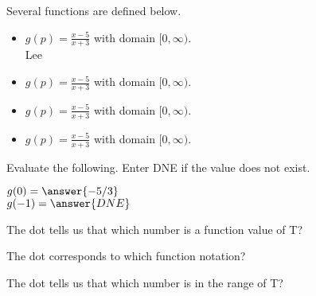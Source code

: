 \documentclass{ximera}
\begin{document}
\begin{definition}
Several functions are defined below.
\begin{itemize}
\item $g(p) = \frac{x-5}{x+3}$ with domain $[0, \infty)$. \\ Lee
\item $g(p) = \frac{x-5}{x+3}$ with domain $[0, \infty)$. 
\item $g(p) = \frac{x-5}{x+3}$ with domain $[0, \infty)$. 
\item $g(p) = \frac{x-5}{x+3}$ with domain $[0, \infty)$. 
\end{itemize}
\end{definition}



\begin{exercise}
Evaluate the following.  Enter DNE if the value does not exist.

$g(0) = \answer{-5/3}$  \\
$g(-1) = \answer{DNE}$


\end{exercise}






\begin{exercise}
The dot tells us that which number is a function value of T?

\begin{selectAll}
\end{selectAll}

\end{exercise}




\begin{exercise}
The dot corresponds to which function notation? 

\begin{selectAll}
\end{selectAll}

\end{exercise}





\begin{exercise}
The dot tells us that which number is in the range of T?

\begin{selectAll}
\end{selectAll}

\end{exercise}
\end{document}
